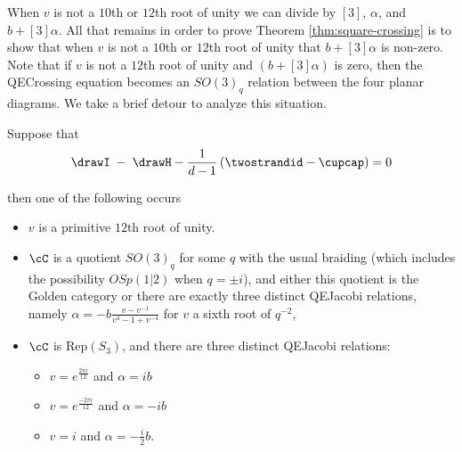 \documentclass[12pt]{amsart}
\begin{document}
When $v$ is not a $10$th or $12$th root of unity we can divide by $[3]$, $\alpha$, and $b+[3]\alpha$.  All that remains in order to prove Theorem \ref{thm:square-crossing} is to show that when $v$ is not a $10$th or $12$th root of unity that $b+[3]\alpha$ is non-zero.  Note that if $v$ is not a $12$th root of unity and $(b+[3]\alpha)$ is zero, then the QECrossing equation becomes an $SO(3)_q$ relation between the four planar diagrams.  We take a brief detour to analyze this situation.


\begin{lemma} \label{lem:IequalsH}
Suppose that 
$$\drawI\;- \; \drawH - \frac{1}{d-1} \left(\twostrandid - \cupcap \right) = 0$$

then one of the following occurs

\begin{itemize}
\item $v$ is a primitive $12$th root of unity.

 \item $\cC$ is a quotient $SO(3)_q$ for some $q$ with the usual braiding (which includes the possibility $OSp(1|2)$ when $q= \pm i$), and either this quotient is the Golden category or there are exactly three distinct QEJacobi relations, namely $\alpha = -b \frac{v-v^{-1}}{v^4-1+v^{-4}}$ for $v$ a sixth root of $q^{-2}$,

 \item $\cC$ is  $\mathrm{Rep}(S_3)$, and there are three distinct QEJacobi relations: 
\begin{itemize}
\item $v = e^{\frac{2 \pi i}{12}}$ and $\alpha = i b$
\item $v = e^{\frac{-2 \pi i}{12}}$ and $\alpha = -i b$
\item $v = i$ and $\alpha = -\frac{i}{2} b$.
\end{itemize}

\end{itemize}
\end{lemma}
\end{document}
